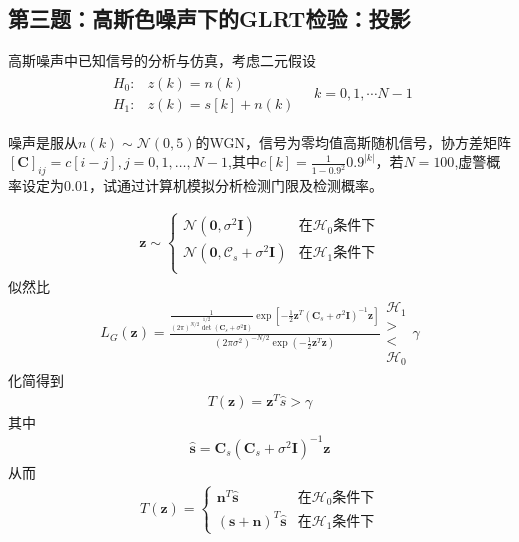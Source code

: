 \documentclass[fontset=windows]{article}
\numberwithin{figure}{section}
\begin{document}
\subsection{第三题：高斯色噪声下的GLRT检验：投影}

高斯噪声中已知信号的分析与仿真，考虑二元假设
\begin{align*}
	\begin{matrix}
		H_0: & z(k)=n(k)      \\
		H_1: & z(k)=s[k]+n(k)
	\end{matrix}\quad k=0,1,\cdots N-1
\end{align*}

噪声是服从\(n(k)\sim \mathcal{N}(0,5)\)的WGN，信号为零均值高斯随机信号，协方差矩阵\([\mathbf{C}]_{ij}=c[i-j],j=0,1,\ldots,N-1\),其中\(c[k]=\frac{1}{1-0.9^2}0.9^{|k|}\)，若\(N=100\),虚警概率设定为0.01，试通过计算机模拟分析检测门限及检测概率。

\begin{align*}
	\mathbf{z}\sim\left\{
	\begin{matrix}
		\mathcal{N}(\mathbf{0},\sigma^2\mathbf{I})               & \text{在}\mathcal{H}_0\text{条件下} \\
		\mathcal{N}(\mathbf{0},\mathcal{C}_s+\sigma^2\mathbf{I}) & \text{在}\mathcal{H}_1\text{条件下} \\
	\end{matrix}
	\right.
\end{align*}
似然比
\begin{align*}
	L_G(\mathbf{z})=\frac{\frac{1}{(2\pi)^{N/2}\det^{1/2}(\mathbf{C}_s+\sigma^2\mathbf{I})}
		\exp\left[-\frac{1}{2}\mathbf{z}^T(\mathbf{C}_s+\sigma^2\mathbf{I})^{-1}\mathbf{z}\right]}
	{(2\pi \sigma^2)^{-N/2}\exp\left(-\frac{1}{2}\mathbf{z}^T\mathbf{z}\right)}
	\begin{matrix}
		\mathcal{H}_1 \\>\\<\\\mathcal{H}_0
	\end{matrix} \gamma
\end{align*}
化简得到
\begin{align*}
	T(\mathbf{z})=\mathbf{z}^T\hat{s}>\gamma
\end{align*}
其中
\begin{align*}
	\hat{\mathbf{s}}=\mathbf{C}_s(\mathbf{C}_s+\sigma^2\mathbf{I})^{-1}\mathbf{z}
\end{align*}
从而
\begin{align}
	T(\mathbf{z})=
	\left\{
	\begin{matrix}
		\mathbf{n}^T\hat{\mathbf{s}}              & \text{在}\mathcal{H}_0\text{条件下} \\
		(\mathbf{s}+\mathbf{n})^T\hat{\mathbf{s}} & \text{在}\mathcal{H}_1\text{条件下}
	\end{matrix}
	\right.
\end{align}
\end{document}

